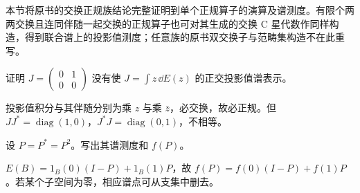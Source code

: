 本节将原书的交换正规族结论完整证明到单个正规算子的演算及谱测度。有限个两两交换且连同伴随一起交换的正规算子也可对其生成的交换 C 星代数作同样构造，得到联合谱上的投影值测度；任意族的原书双交换子与范畴集构造不在此重写。

\begin{exercise}[正规性不可省略]\label{ex:y11-jordan-normal}
证明 $J=\left(\begin{smallmatrix}0&1\\0&0\end{smallmatrix}\right)$ 没有使 $J=\int z\,\dd E(z)$ 的正交投影值谱表示。
\end{exercise}
\begin{solution}
投影值积分与其伴随分别为乘 $z$ 与乘 $\bar z$，必交换，故必正规。但 $JJ^*=\operatorname{diag}(1,0)$，$J^*J=\operatorname{diag}(0,1)$，不相等。
\end{solution}

\begin{exercise}[投影的谱测度]\label{ex:y11-projection-pvm}
设 $P=P^*=P^2$。写出其谱测度和 $f(P)$。
\end{exercise}
\begin{solution}
$E(B)=1_B(0)(I-P)+1_B(1)P$，故 $f(P)=f(0)(I-P)+f(1)P$。若某个子空间为零，相应谱点可从支集中删去。
\end{solution}
